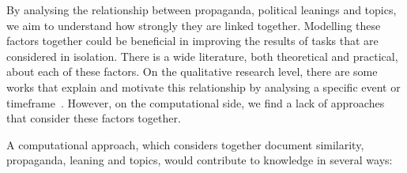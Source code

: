 By analysing the relationship between propaganda, political leanings and topics, we aim to understand how strongly they are linked together.
Modelling these factors together could be beneficial in improving the results of tasks that are considered in isolation.
There is a wide literature, both theoretical and practical, about each of these factors.
On the qualitative research level, there are some works that explain and motivate this relationship by analysing a specific event or timeframe~\citep{pierri2023propaganda,golovchenko2020cross,blumberg1986comparative}.
However, on the computational side, we find a lack of approaches that consider these factors together.

A computational approach, which considers together document similarity, propaganda, leaning and topics, would contribute to knowledge in several ways:


